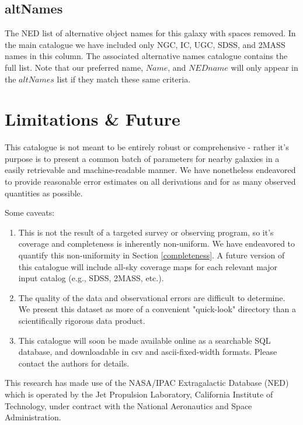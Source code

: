 \subsection{altNames}
The NED list of alternative object names for this galaxy with spaces removed. In the main catalogue we have included only NGC, IC, UGC, SDSS, and 2MASS names in this column. The associated alternative names catalogue contains the full list. Note that our preferred name, $Name$, and $NEDname$ will only appear in the $altNames$ list if they match these same criteria.\\


\section{Limitations \& Future}

This catalogue is not meant to be entirely robust or comprehensive - rather it's purpose is to present a common batch of parameters for nearby galaxies in a easily retrievable and machine-readable manner. We have nonetheless endeavored to provide reasonable error estimates on all derivations and for as many observed quantities as possible.

Some caveats:

\begin{enumerate}

\item{This is not the result of a targeted survey or observing program, so it's coverage and completeness is inherently non-uniform. We have endeavored to quantify this non-uniformity in Section \ref{completeness}. A future version of this catalogue will include all-sky coverage maps for each relevant major input catalog (e.g., SDSS, 2MASS, etc.).}

\item{The quality of the data and observational errors are difficult to determine. We present this dataset as more of a convenient "quick-look" directory than a scientifically rigorous data product.}

\item{This catalogue will soon be made available online as a searchable SQL database, and downloadable in csv and ascii-fixed-width formats. Please contact the authors for details.}
\end{enumerate}


\acknowledgements

This research has made use of the NASA/IPAC Extragalactic Database (NED) which is operated by the Jet Propulsion Laboratory, California Institute of Technology, under contract with the National Aeronautics and Space Administration. 



%





